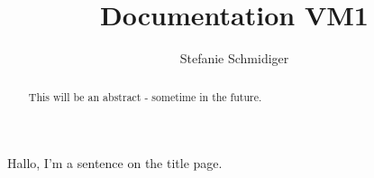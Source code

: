 \documentclass[a4paper,
11pt]{article}
\title{Documentation VM1}
\author{Stefanie Schmidiger}
\begin{document}
\begin{titlepage}
\maketitle
Hallo, I'm a sentence on the title page.
\end{titlepage}

\begin{abstract}
This will be an abstract - sometime in the future.
\end{abstract}

\newpage
\newpage
\newpage
\newpage
\newpage
\newpage
\newpage
\newpage
\end{document}
